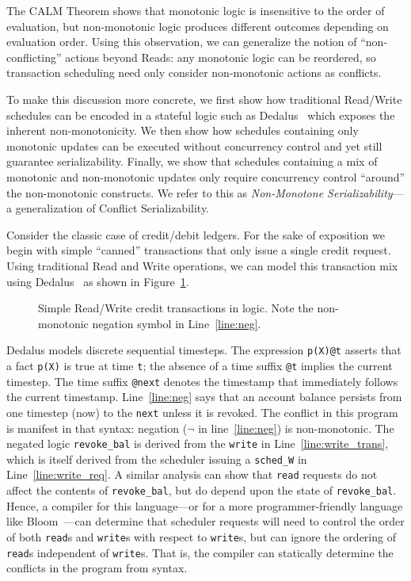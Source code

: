\documentclass{sig-alternate}
\begin{document}
The CALM Theorem shows that monotonic logic is insensitive to the order of evaluation, but non-monotonic logic produces different outcomes depending on evaluation order.  Using this observation, we can generalize the notion of ``non-conflicting'' actions beyond Reads: any monotonic logic can be reordered, so transaction scheduling need only consider non-monotonic actions as conflicts.

To make this discussion more concrete, we first show how traditional Read/Write
schedules can be encoded in a stateful logic such as Dedalus~\cite{dedalus} which exposes 
the inherent non-monotonicity. We
then show how schedules containing only monotonic updates can be executed
without concurrency control and yet still guarantee serializability. Finally, we
show that schedules containing a mix of monotonic and non-monotonic updates only
require concurrency control ``around'' the non-monotonic constructs. We refer to
this as \emph{Non-Monotone Serializability}---a generalization of Conflict Serializability.

Consider the classic case of credit/debit ledgers. For the sake of exposition we begin with simple ``canned'' transactions that only issue a single credit request.  Using
traditional Read and Write operations, we can model this transaction mix using Dedalus~\cite{dedalus} as
shown in Figure~\ref{fig:balance}.


\begin{figure}[h]
\begin{scriptsize}

\centering
\vspace{-10pt}
\caption{Simple Read/Write credit transactions in logic.  Note the non-monotonic negation symbol in Line~\ref{line:neg}.}
\label{fig:balance}
\end{scriptsize}
\vspace{-2pt}
\end{figure}

Dedalus models discrete sequential timesteps.
The expression \texttt{p(X)@t} asserts that a fact \texttt{p(X)} is true at time
\texttt{t}; the absence of a time suffix \texttt{@t} implies the current timestep.  The time suffix \texttt{@next} denotes the timestamp that immediately follows the
current timestamp.  Line~\ref{line:neg} says that an account balance persists from one timestep (now) to the \texttt{next} unless it is revoked. The
conflict in this program is manifest in that syntax: negation
($\neg$ in line~\ref{line:neg}) is non-monotonic.  The negated logic \texttt{revoke\_bal} is derived from the \texttt{write} in Line~\ref{line:write_trans}, which is itself derived from the scheduler issuing a \texttt{sched\_W} in Line~\ref{line:write_req}.  A similar analysis can show that \texttt{read} requests do not affect the contents of \texttt{revoke\_bal}, but do depend upon the state of \texttt{revoke\_bal}.
Hence, a compiler for this language---or for a more programmer-friendly language like Bloom~\cite{Alvaro2011}---can determine that scheduler requests will need to control the order of both \texttt{read}s and \texttt{write}s with respect to \texttt{write}s, but can ignore the ordering of \texttt{read}s independent of \texttt{write}s.  That is, the compiler can statically determine the conflicts in the program from syntax.
\end{document}
